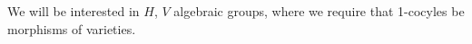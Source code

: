 We will be interested in $H$, $V$ algebraic groups, where we require that 1-cocyles be morphisms of varieties. 

% 
% 
% 
% 
% 
